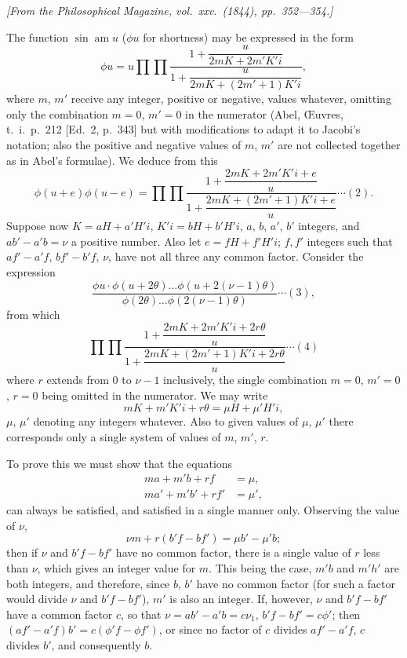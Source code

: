 \documentclass[11pt,a4paper]{book}
\begin{document}
\textit{[From the Philosophical Magazine, vol.~xxv.~(1844), pp.~352---354.]}

\bigskip
\setcounter{page}{120}

The function $\sin \operatorname{am} u$ ($\phi u$ for shortness) may be expressed in the form
\[
\phi u = u \prod \prod \frac{1 + \dfrac{u}{2mK + 2m'K'i}}{1 + \dfrac{u}{2mK + (2m'+1)K'i}},
\]
where $m$, $m'$ receive any integer, positive or negative, values whatever, omitting only
the combination $m = 0$, $m' = 0$ in the numerator (Abel, \OE uvres, t.~i.\ p.~212 [Ed.~2,
p.~343] but with modifications to adapt it to Jacobi's notation; also the positive and
negative values of $m$, $m'$ are not collected together as in Abel's formulae). We deduce
from this
\[
\phi(u+e)\phi(u-e) = \prod \prod \frac{1 + \dfrac{2mK + 2m'K'i + e}{u}}{1 + \dfrac{2mK + (2m'+1)K'i + e}{u}} \cdots (2).
\]
Suppose now $K = aH + a'H'i$, $K'i = bH + b'H'i$, $a$, $b$, $a'$, $b'$ integers, and $ab' - a'b = \nu$
a positive number. Also let $e = fH + f'H'i$; $f, f'$ integers such that $af' - a'f$, $bf' - b'f$, $\nu$,
have not all three any common factor. Consider the expression
\[
\frac{\phi u \cdot \phi(u + 2\theta) \ldots \phi(u + 2(\nu-1)\theta)}{\phi(2\theta) \ldots \phi(2(\nu-1)\theta)} \cdots (3),
\]
from which
\[
\prod \prod \frac{1 + \dfrac{2mK + 2m'K'i + 2r\theta}{u}}{1 + \dfrac{2mK + (2m'+1)K'i + 2r\theta}{u}} \cdots (4)
\]
where $r$ extends from $0$ to $\nu-1$ inclusively, the single combination $m = 0$, $m' = 0$, $r = 0$
being omitted in the numerator. We may write
\[
mK + m'K'i + r\theta = \mu H + \mu'H'i,
\]
$\mu$, $\mu'$ denoting any integers whatever. Also to given values of $\mu$, $\mu'$ there corresponds
only a single system of values of $m$, $m'$, $r$.

\newpage
\setcounter{page}{121}

To prove this we must show that the equations
\begin{align*}
ma + m'b + rf &= \mu,\\
ma' + m'b' + rf' &= \mu',
\end{align*}
can always be satisfied, and satisfied in a single manner only. Observing the value of $\nu$,
\[
\nu m + r(b'f - bf') = \mu b' - \mu'b;
\]
then if $\nu$ and $b'f - bf'$ have no common factor, there is a single value of $r$ less than $\nu$,
which gives an integer value for $m$. This being the case, $m'b$ and $m'h'$ are both
integers, and therefore, since $b$, $b'$ have no common factor (for such a factor would
divide $\nu$ and $b'f - bf'$), $m'$ is also an integer. If, however, $\nu$ and $b'f - bf'$ have a
common factor $c$, so that $\nu = ab' - a'b = c\nu_1$, $b'f - bf' = c\phi'$; then $(af' - a'f)b' = c(\phi'f - \phi f')$,
or since no factor of $c$ divides $af' - a'f$, $c$ divides $b'$, and consequently $b$.
\end{document}
